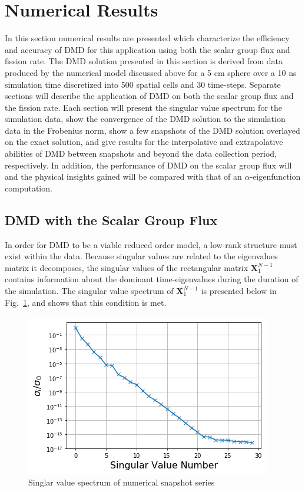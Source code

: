 \documentclass{style/nseJournal}
\newcommand{\LFI}[1]{\label{fi:#1}}
\newcommand{\FI}[1]{Fig.~\ref{fi:#1}}
\newcommand{\bfg}{\begin{figure}}
\newcommand{\efg}{\end{figure}}
\begin{document}
\section{Numerical Results}
In this section numerical results are presented which characterize the efficiency and accuracy of DMD for this application using both the scalar group flux and fission rate.  
The DMD solution presented in this section is derived from data produced by the numerical model discussed above for a 5 cm sphere over a 10 ns simulation time discretized into 500 spatial cells and 30 time-steps.  
Separate sections will describe the application of DMD on both the scalar group flux and the fission rate.  
Each section will present the singular value spectrum for the simulation data, show the convergence of the DMD solution to the simulation data in the Frobenius norm, show a few snapshots of the DMD solution overlayed on the exact solution, and give results for the interpolative and extrapolative abilities of DMD between snapshots and beyond the data collection period, respectively.  
In addition, the performance of DMD on the scalar group flux will and the physical insights gained will be compared with that of an $\alpha$-eigenfunction computation.  

\subsection{DMD with the Scalar Group Flux}
In order for DMD to be a viable reduced order model, a low-rank structure must exist within the data.  
Because singular values are related to the eigenvalues matrix it decomposes, the singular values of the rectangular matrix $\bm{X}^{N-1}_1$ contains information about the dominant time-eigenvalues during the duration of the simulation.  
The singular value spectrum of  $\bm{X}^{N-1}_1$ is presented below in \FI{sv-spec}, and shows that this condition is met.  

\bfg[h] \centering
	\includegraphics[scale=0.5]{figures/singularValueSpectrum_flux.png}
	\caption{Singlar value spectrum of numerical snapshot series}
	\LFI{sv-spec}
\efg
\end{document}
